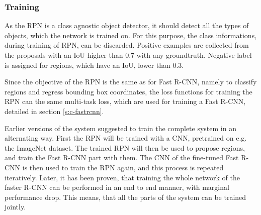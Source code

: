 \subsubsection{Training}
As the RPN is a class agnostic object detector, it should detect all the types of objects, which the network is trained on. For this purpose, the class informations, during training of RPN, can be discarded. Positive examples are collected from the proposals with an IoU higher than 0.7 with any groundtruth. Negative label is assigned for regions, which have an IoU, lower than 0.3.

Since the objective of the RPN is the same as for Fast R-CNN, namely to classify regions and regress bounding box coordinates, the loss functions for training the RPN can the same multi-task loss, which are used for training a Fast R-CNN, detailed in section \ref{s:c-fastrcnn}.

Earlier versions of the system suggested to train the complete system in an alternating way. First the RPN will be trained with a CNN, pretrained on e.g. the ImageNet dataset. The trained RPN will then be used to propose regions, and train the Fast R-CNN part with them. The CNN of the fine-tuned Fast R-CNN is then used to train the RPN again, and this process is repeated iteratively. Later, it has been proven, that training the whole network of the faster R-CNN can be performed in an end to end manner, with marginal performance drop. This means, that all the parts of the system can be trained jointly.